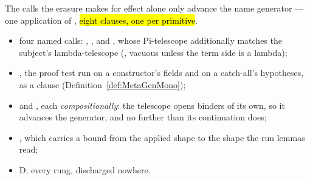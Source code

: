 \begin{assumption}
\label{asm:ErasureSpec-prim_monotone}
\leanok
{}
\stAssumed{}  The calls the erasure makes for effect alone only advance the name
generator --- one application of , \hl{eight clauses, one per primitive}.
\begin{itemize}
\item {} four named calls: , ,
 and , whose Pi-telescope additionally
matches the subject's lambda-telescope (, vacuous unless the term side is a
lambda);
\item {}, the proof test run on a constructor's fields and on a catch-all's
hypotheses, as a  clause (Definition~\ref{def:MetaGenMono});
\item {} and , each
\emph{compositionally}: the telescope opens binders of its own, so it advances the generator, and
no further than its continuation does;
\item {}, which carries a bound from the applied  shape to the
shape the run lemmas read;
\item {} D;  every rung, discharged nowhere.
\end{itemize}
\end{assumption}

